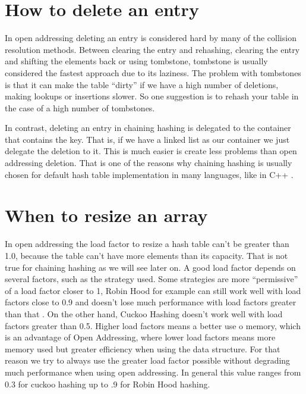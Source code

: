 \section{How to delete an entry}

In open addressing deleting an entry is considered hard by many of the collision resolution methods. Between clearing the entry and rehashing, clearing the entry and shifting the elements back or using tombstone, tombstone is usually considered the fastest approach due to its laziness.
The problem with tombstones is that it can make the table ``dirty'' if we have a high number of deletions, making lookups or insertions slower. So one suggestion is to rehash your table in the case of a high number of tombstones.

In contrast, deleting an entry in chaining hashing is delegated to the container that contains the key. That is, if we have a linked list as our container we just delegate the deletion to it. This is much easier is create less problems than open addressing deletion. That is one of the reasons why chaining hashing is usually chosen for default hash table implementation in many languages, like in C++ \citep{UnorderedMapDiscussion}.

\section{When to resize an array}

In open addressing the load factor to resize a hash table can't be greater than 1.0, because the table can't have more elements than its capacity. That is not true for chaining hashing as we will see later on. A good load factor depends on several factors, such as the strategy used. Some strategies are more ``permissive'' of a load factor closer to 1, Robin Hood for example can still work well with load factors close to 0.9 and doesn't lose much performance with load factors greater than that \citep{RobinHoodDefault}. On the other hand, Cuckoo Hashing doesn't work well with load factors greater than 0.5. Higher load factors means a better use o memory, which is an advantage of Open Addressing, where lower load factors means more memory used but greater efficiency when using the data structure. For that reason we try to always use the greater load factor possible without degrading much performance when using open addressing. In general this value ranges from 0.3 for cuckoo hashing up to .9 for Robin Hood hashing.

